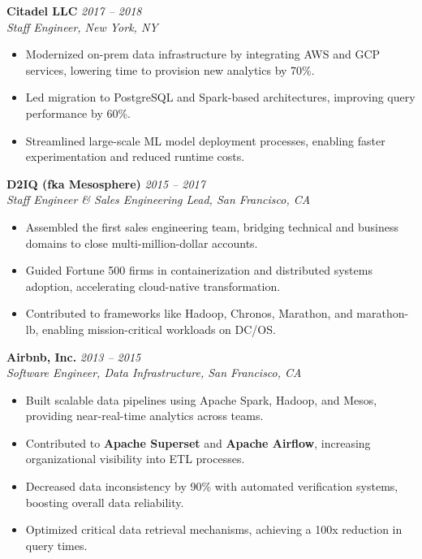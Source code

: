 \documentclass[margin,line]{resume}
\begin{document}
\begin{resume}
\textbf{Citadel LLC} \hfill \textit{2017 -- 2018}\\
\textit{Staff Engineer, New York, NY}
\begin{itemize}[leftmargin=0.5cm]
    \item Modernized on-prem data infrastructure by integrating AWS and GCP services, lowering time to provision new analytics by 70\%.
    \item Led migration to PostgreSQL and Spark-based architectures, improving query performance by 60\%.
    \item Streamlined large-scale ML model deployment processes, enabling faster experimentation and reduced runtime costs.
\end{itemize}

\textbf{D2IQ (fka Mesosphere)} \hfill \textit{2015 -- 2017}\\
\textit{Staff Engineer \& Sales Engineering Lead, San Francisco, CA}
\begin{itemize}[leftmargin=0.5cm]
    \item Assembled the first sales engineering team, bridging technical and business domains to close multi-million-dollar accounts.
    \item Guided Fortune 500 firms in containerization and distributed systems adoption, accelerating cloud-native transformation.
    \item Contributed to frameworks like Hadoop, Chronos, Marathon, and marathon-lb, enabling mission-critical workloads on DC/OS.
\end{itemize}

\textbf{Airbnb, Inc.} \hfill \textit{2013 -- 2015}\\
\textit{Software Engineer, Data Infrastructure, San Francisco, CA}
\begin{itemize}[leftmargin=0.5cm]
    \item Built scalable data pipelines using Apache Spark, Hadoop, and Mesos, providing near-real-time analytics across teams.
    \item Contributed to \textbf{Apache Superset} and \textbf{Apache Airflow}, increasing organizational visibility into ETL processes.
    \item Decreased data inconsistency by 90\% with automated verification systems, boosting overall data reliability.
    \item Optimized critical data retrieval mechanisms, achieving a 100x reduction in query times.
\end{itemize}


\end{resume}
\end{document}
